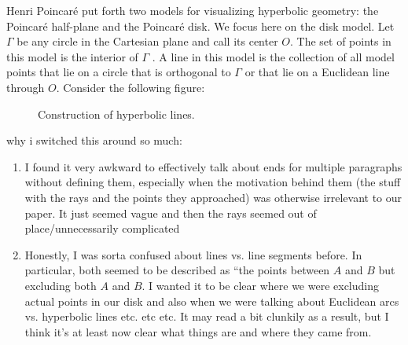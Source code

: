 \documentclass[12pt]{article}
\newcommand{\poincare}{Poincar\'{e} }
\theoremstyle{plain}
\theoremstyle{definition}
\begin{document}
Henri \poincare put forth two models for visualizing hyperbolic geometry: the \poincare half-plane and the \poincare disk. We focus here on the disk model. Let $\Gamma$ be any circle in the Cartesian plane and call its center $O$. The set of points in this model is the interior of $\Gamma$ \cite{hartshorne}. A line in this model is the collection of all model points that lie on a circle that is orthogonal to $\Gamma$ or that lie on a Euclidean line through $O$. Consider the following figure:

\begin{figure}[h]
\begin{center}
\end{center}
	\label{fig:construction_hyperbolic_lines}
	\caption{Construction of hyperbolic lines.}
\end{figure}

	\color{blue} why i switched this around so much:
	\begin{enumerate}
		\item I found it very awkward to effectively talk about ends for multiple paragraphs without defining them, especially when the motivation behind them (the stuff with the rays and the points they approached) was otherwise irrelevant to our paper. It just seemed vague and then the rays seemed out of place/unnecessarily complicated
		\item Honestly, I was sorta confused about lines vs. line segments before. In particular, both seemed to be described as ``the points between $A$ and $B$ but excluding both $A$ and $B$. I wanted it to be clear where we were excluding actual points in our disk and also when we were talking about Euclidean arcs vs. hyperbolic lines etc. etc etc. It may read a bit clunkily as a result, but I think it's at least now clear what things are and where they came from. 
	\end{enumerate}
	\color{black}
	
\end{document}

